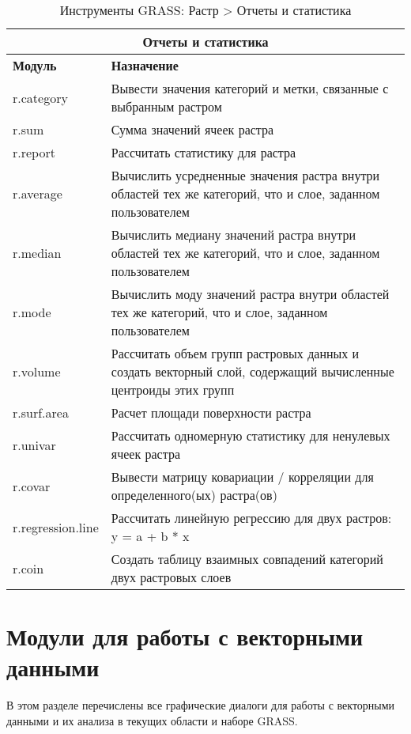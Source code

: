 {\renewcommand{\arraystretch}{0.7}
\begin{table}[H]
\centering
 \begin{tabular}{|p{4cm}|p{10cm}|}
  \hline \multicolumn{2}{|c|}{\textbf{Отчеты и статистика}} \\
  \hline \textbf{Модуль} & \textbf{Назначение} \\
  \hline r.category & Вывести значения категорий и метки, связанные с
  выбранным растром \\
  \hline r.sum & Сумма значений ячеек растра \\
  \hline r.report & Рассчитать статистику для растра \\
  \hline r.average & Вычислить усредненные значения растра внутри областей
  тех же категорий, что и слое, заданном пользователем \\
  \hline r.median & Вычислить медиану значений растра внутри областей тех
  же категорий, что и слое, заданном пользователем \\
  \hline r.mode & Вычислить моду значений растра внутри областей тех же
  категорий, что и слое, заданном пользователем \\
  \hline r.volume & Рассчитать объем групп растровых данных и создать
  векторный слой, содержащий вычисленные центроиды этих групп \\
  \hline r.surf.area & Расчет площади поверхности растра \\
  \hline r.univar & Рассчитать одномерную статистику для ненулевых ячеек
  растра \\
  \hline r.covar & Вывести матрицу ковариации / корреляции для
  определенного(ых) растра(ов) \\
  \hline r.regression.line & Рассчитать линейную регрессию для двух
  растров: y = a + b * x \\
  \hline r.coin & Создать таблицу взаимных совпадений категорий двух
  растровых слоев \\
\hline
\end{tabular}
\caption{Инструменты GRASS: Растр > Отчеты и статистика}
\end{table}}

\clearpage

\section{Модули для работы с векторными данными}

В этом разделе перечислены все графические диалоги для работы с
векторными данными и их анализа в текущих области и наборе GRASS.

